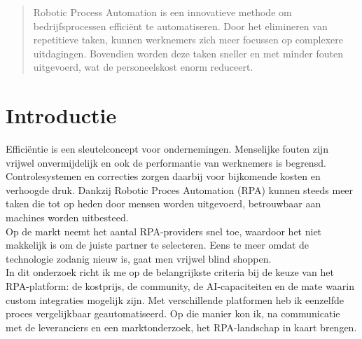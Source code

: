 \documentclass[a0,portrait]{a0poster}
\begin{document}
\begin{multicols}{2}


\color{HoGentAccent1}

\begin{abstract}
	Robotic Process Automation is een innovatieve methode om bedrijfsprocessen efficiënt te automatiseren. Door het elimineren van repetitieve taken, kunnen werknemers zich meer focussen op complexere uitdagingen. Bovendien worden deze taken sneller en met minder fouten uitgevoerd, wat de personeelskost enorm reduceert.
\end{abstract}

\color{HoGentAccent1} 
\section*{Introductie}
\color{black}
Efficiëntie is een sleutelconcept voor ondernemingen. Menselijke fouten zijn vrijwel onvermijdelijk en ook de performantie van werknemers is begrensd. Controlesystemen en correcties zorgen daarbij voor bijkomende kosten en verhoogde druk. Dankzij Robotic Proces Automation (RPA) kunnen steeds meer taken die tot op heden door mensen worden uitgevoerd, betrouwbaar aan machines worden uitbesteed.\\
Op de markt neemt het aantal RPA-providers snel toe, waardoor het niet makkelijk is om de juiste partner te selecteren. Eens te meer omdat de technologie zodanig nieuw is, gaat men vrijwel blind shoppen.\\
In dit onderzoek richt ik me op de belangrijkste criteria bij
de keuze van het RPA-platform: de kostprijs, de community, de AI-capaciteiten en de mate waarin custom integraties mogelijk zijn. Met verschillende platformen heb ik eenzelfde proces vergelijkbaar geautomatiseerd. Op die manier kon ik, na communicatie met de leveranciers en een marktonderzoek, het RPA-landschap in kaart brengen.

\color{Black}
\color{HoGentAccent1} 

\end{multicols}
\end{document}
